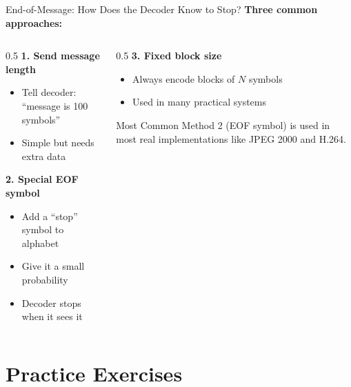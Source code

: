 \documentclass[aspectratio=169,12pt]{beamer}
\begin{document}
\begin{frame}{End-of-Message: How Does the Decoder Know to Stop?}
    \textbf{Three common approaches:}
    
    \vspace{0.5cm}
    \begin{columns}
        \begin{column}{0.5\textwidth}
            \textbf{1. Send message length}
            \begin{itemize}
                \item Tell decoder: ``message is 100 symbols''
                \item Simple but needs extra data
            \end{itemize}
            
            \vspace{0.3cm}
            \textbf{2. Special EOF symbol}
            \begin{itemize}
                \item Add a ``stop'' symbol to alphabet
                \item Give it a small probability
                \item Decoder stops when it sees it
            \end{itemize}
        \end{column}
        \begin{column}{0.5\textwidth}
            \textbf{3. Fixed block size}
            \begin{itemize}
                \item Always encode blocks of $N$ symbols
                \item Used in many practical systems
            \end{itemize}
            
            \vspace{0.3cm}
            \begin{block}{Most Common}
                Method 2 (EOF symbol) is used in most real implementations like JPEG 2000 and H.264.
            \end{block}
        \end{column}
    \end{columns}
\end{frame}

\section{Practice Exercises}
\end{document}
